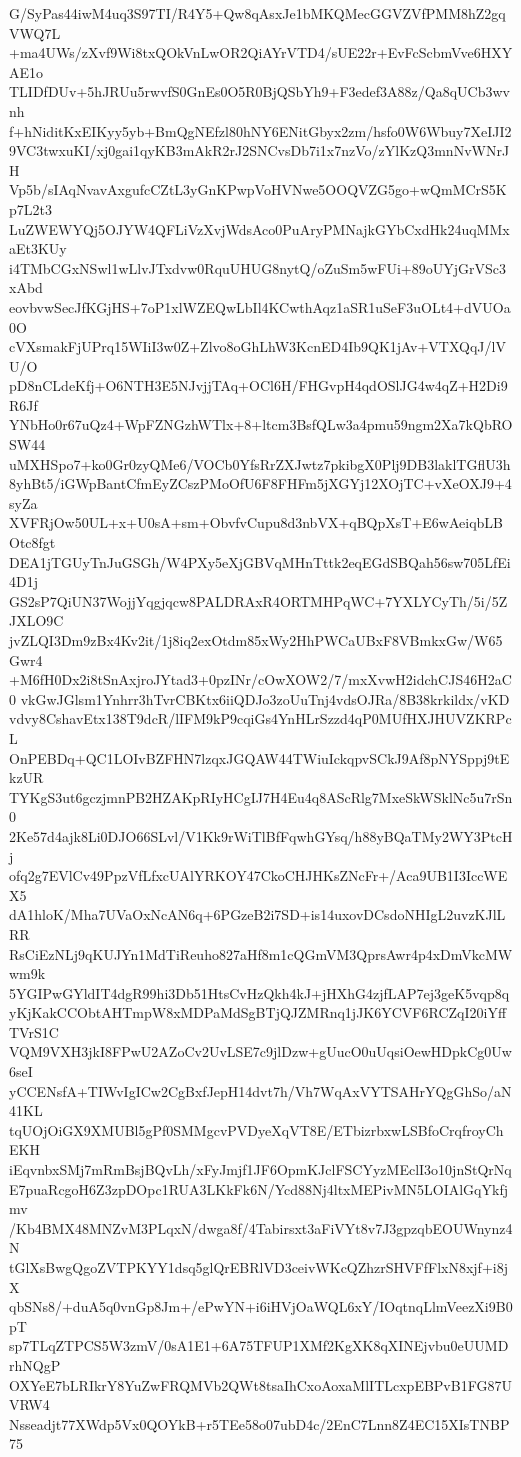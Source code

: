 G/SyPas44iwM4uq3S97TI/R4Y5+Qw8qAsxJe1bMKQMecGGVZVfPMM8hZ2gqVWQ7L
+ma4UWs/zXvf9Wi8txQOkVnLwOR2QiAYrVTD4/sUE22r+EvFcScbmVve6HXYAE1o
TLIDfDUv+5hJRUu5rwvfS0GnEs0O5R0BjQSbYh9+F3edef3A88z/Qa8qUCb3wvnh
f+hNiditKxEIKyy5yb+BmQgNEfzl80hNY6ENitGbyx2zm/hsfo0W6Wbuy7XeIJI2
9VC3twxuKI/xj0gai1qyKB3mAkR2rJ2SNCvsDb7i1x7nzVo/zYlKzQ3mnNvWNrJH
Vp5b/sIAqNvavAxgufcCZtL3yGnKPwpVoHVNwe5OOQVZG5go+wQmMCrS5Kp7L2t3
LuZWEWYQj5OJYW4QFLiVzXvjWdsAco0PuAryPMNajkGYbCxdHk24uqMMxaEt3KUy
i4TMbCGxNSwl1wLlvJTxdvw0RquUHUG8nytQ/oZuSm5wFUi+89oUYjGrVSc3xAbd
eovbvwSecJfKGjHS+7oP1xlWZEQwLbIl4KCwthAqz1aSR1uSeF3uOLt4+dVUOa0O
cVXsmakFjUPrq15WIiI3w0Z+Zlvo8oGhLhW3KcnED4Ib9QK1jAv+VTXQqJ/lVU/O
pD8nCLdeKfj+O6NTH3E5NJvjjTAq+OCl6H/FHGvpH4qdOSlJG4w4qZ+H2Di9R6Jf
YNbHo0r67uQz4+WpFZNGzhWTlx+8+ltcm3BsfQLw3a4pmu59ngm2Xa7kQbROSW44
uMXHSpo7+ko0Gr0zyQMe6/VOCb0YfsRrZXJwtz7pkibgX0Plj9DB3laklTGflU3h
8yhBt5/iGWpBantCfmEyZCszPMoOfU6F8FHFm5jXGYj12XOjTC+vXeOXJ9+4syZa
XVFRjOw50UL+x+U0sA+sm+ObvfvCupu8d3nbVX+qBQpXsT+E6wAeiqbLBOtc8fgt
DEA1jTGUyTnJuGSGh/W4PXy5eXjGBVqMHnTttk2eqEGdSBQah56sw705LfEi4D1j
GS2sP7QiUN37WojjYqgjqcw8PALDRAxR4ORTMHPqWC+7YXLYCyTh/5i/5ZJXLO9C
jvZLQI3Dm9zBx4Kv2it/1j8iq2exOtdm85xWy2HhPWCaUBxF8VBmkxGw/W65Gwr4
+M6fH0Dx2i8tSnAxjroJYtad3+0pzINr/cOwXOW2/7/mxXvwH2idchCJS46H2aC0
vkGwJGlsm1Ynhrr3hTvrCBKtx6iiQDJo3zoUuTnj4vdsOJRa/8B38krkildx/vKD
vdvy8CshavEtx138T9dcR/lIFM9kP9cqiGs4YnHLrSzzd4qP0MUfHXJHUVZKRPcL
OnPEBDq+QC1LOIvBZFHN7lzqxJGQAW44TWiuIckqpvSCkJ9Af8pNYSppj9tEkzUR
TYKgS3ut6gczjmnPB2HZAKpRIyHCgIJ7H4Eu4q8AScRlg7MxeSkWSklNc5u7rSn0
2Ke57d4ajk8Li0DJO66SLvl/V1Kk9rWiTlBfFqwhGYsq/h88yBQaTMy2WY3PtcHj
ofq2g7EVlCv49PpzVfLfxcUAlYRKOY47CkoCHJHKsZNcFr+/Aca9UB1I3IccWEX5
dA1hloK/Mha7UVaOxNcAN6q+6PGzeB2i7SD+is14uxovDCsdoNHIgL2uvzKJlLRR
RsCiEzNLj9qKUJYn1MdTiReuho827aHf8m1cQGmVM3QprsAwr4p4xDmVkcMWwm9k
5YGIPwGYldIT4dgR99hi3Db51HtsCvHzQkh4kJ+jHXhG4zjfLAP7ej3geK5vqp8q
yKjKakCCObtAHTmpW8xMDPaMdSgBTjQJZMRnq1jJK6YCVF6RCZqI20iYffTVrS1C
VQM9VXH3jkI8FPwU2AZoCv2UvLSE7c9jlDzw+gUucO0uUqsiOewHDpkCg0Uw6seI
yCCENsfA+TIWvIgICw2CgBxfJepH14dvt7h/Vh7WqAxVYTSAHrYQgGhSo/aN41KL
tqUOjOiGX9XMUBl5gPf0SMMgcvPVDyeXqVT8E/ETbizrbxwLSBfoCrqfroyChEKH
iEqvnbxSMj7mRmBsjBQvLh/xFyJmjf1JF6OpmKJclFSCYyzMEclI3o10jnStQrNq
E7puaRcgoH6Z3zpDOpc1RUA3LKkFk6N/Ycd88Nj4ltxMEPivMN5LOIAlGqYkfjmv
/Kb4BMX48MNZvM3PLqxN/dwga8f/4Tabirsxt3aFiVYt8v7J3gpzqbEOUWnynz4N
tGlXsBwgQgoZVTPKYY1dsq5glQrEBRlVD3ceivWKcQZhzrSHVFfFlxN8xjf+i8jX
qbSNs8/+duA5q0vnGp8Jm+/ePwYN+i6iHVjOaWQL6xY/IOqtnqLlmVeezXi9B0pT
sp7TLqZTPCS5W3zmV/0sA1E1+6A75TFUP1XMf2KgXK8qXINEjvbu0eUUMDrhNQgP
OXYeE7bLRIkrY8YuZwFRQMVb2QWt8tsaIhCxoAoxaMlITLcxpEBPvB1FG87UVRW4
Nsseadjt77XWdp5Vx0QOYkB+r5TEe58o07ubD4c/2EnC7Lnn8Z4EC15XIsTNBP75
